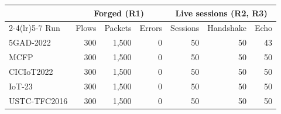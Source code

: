 \begin{tabular}{lrrrrrr}
\toprule
& \multicolumn{3}{c}{Forged (R1)} & \multicolumn{3}{c}{Live sessions (R2, R3)} \\ \cmidrule(lr){2-4}\cmidrule(lr){5-7}
Run & Flows & Packets & Errors & Sessions & Handshake & Echo \\
\midrule
5GAD-2022 & 300 & 1{,}500 & 0 & 50 & 50 & 43 \\
MCFP & 300 & 1{,}500 & 0 & 50 & 50 & 50 \\
CICIoT2022 & 300 & 1{,}500 & 0 & 50 & 50 & 50 \\
IoT-23 & 300 & 1{,}500 & 0 & 50 & 50 & 50 \\
USTC-TFC2016 & 300 & 1{,}500 & 0 & 50 & 50 & 50 \\
\bottomrule
\end{tabular}
